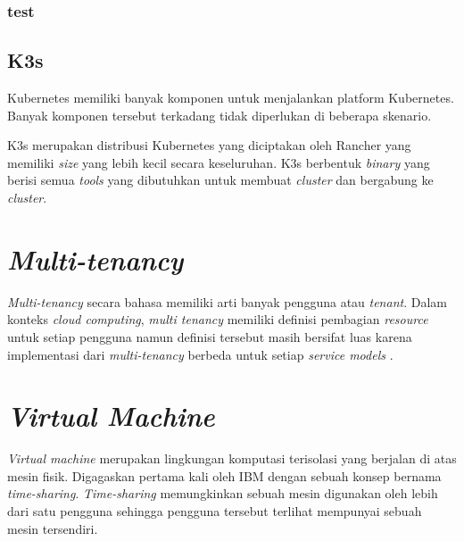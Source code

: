 \subsubsection{test}

\subsection{K3s}

Kubernetes memiliki banyak komponen untuk menjalankan platform Kubernetes. Banyak komponen
tersebut terkadang tidak diperlukan di beberapa skenario. 

K3s merupakan distribusi Kubernetes yang diciptakan oleh Rancher yang
memiliki \emph{size} yang lebih kecil secara keseluruhan. K3s berbentuk
\emph{binary} yang berisi semua \emph{tools} yang dibutuhkan untuk membuat
\emph{cluster} dan bergabung ke \emph{cluster}.

\section{\emph{Multi-tenancy}}
\label{sec:multi-tenancy}

\emph{Multi-tenancy} secara bahasa memiliki arti banyak pengguna atau \emph{tenant}. Dalam konteks
\emph{cloud computing}, \emph{multi tenancy} memiliki definisi pembagian \emph{resource} 
untuk setiap pengguna namun definisi tersebut masih bersifat luas karena implementasi
dari \emph{multi-tenancy} berbeda untuk setiap \emph{service models} \parencite{6830928}.

\section{\emph{Virtual Machine}}
\label{sec:virtual-machine}

\emph{Virtual machine} merupakan lingkungan komputasi terisolasi
yang berjalan di atas mesin fisik. Digagaskan pertama kali oleh IBM
dengan sebuah konsep bernama \emph{time-sharing}. \emph{Time-sharing}
memungkinkan sebuah mesin digunakan oleh lebih dari satu pengguna sehingga
pengguna tersebut terlihat mempunyai sebuah mesin tersendiri.

